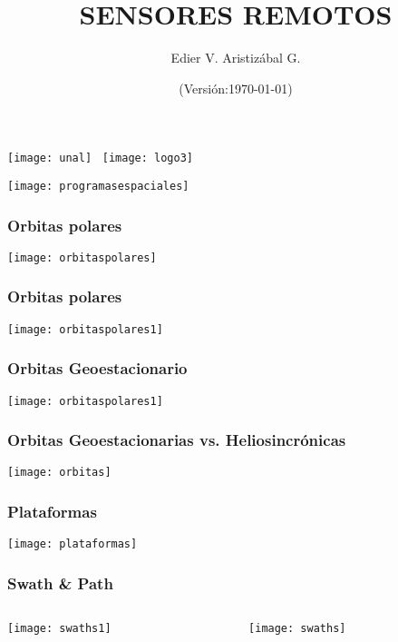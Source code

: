 \documentclass[]{beamer}
\title[Sensores]{SENSORES REMOTOS}
\author[Edier Aristizábal]{Edier V. Aristizábal G.}
\institute{\emph{evaristizabalg@unal.edu.co}}
\date{(Versión:\today)}
\begin{document}
\begin{frame}
\titlepage
\centering
	\texttt{[image: unal]}\hspace*{4.75cm}~%
   	\texttt{[image: logo3]} 
\end{frame}
\begin{frame}
\begin{center}
\texttt{[image: programasespaciales]}
\end{center}
\end{frame}
\begin{frame}
\frametitle{Orbitas polares}
\begin{center}
\texttt{[image: orbitaspolares]}
\end{center}
\end{frame}
\begin{frame}
\frametitle{Orbitas polares}
\begin{center}
\texttt{[image: orbitaspolares1]}
\end{center}
\end{frame}
\begin{frame}
\frametitle{Orbitas Geoestacionario}
\begin{center}
\texttt{[image: orbitaspolares1]}
\end{center}
\end{frame}
\begin{frame}
\frametitle{Orbitas Geoestacionarias vs. Heliosincrónicas}
\begin{center}
\texttt{[image: orbitas]}
\end{center}
\end{frame}
\begin{frame}
\frametitle{Plataformas}
\begin{center}
\texttt{[image: plataformas]}
\end{center}
\end{frame}
\begin{frame}
\frametitle{Swath \& Path}
\begin{columns}
\begin{column}{0.5\linewidth}
\begin{center}
\texttt{[image: swaths1]}
\end{center}
\end{column}
\begin{column}{0.5\linewidth}
\begin{center}
\texttt{[image: swaths]}
\end{center}
\end{column}
\end{columns}
\end{frame}
\end{document}
